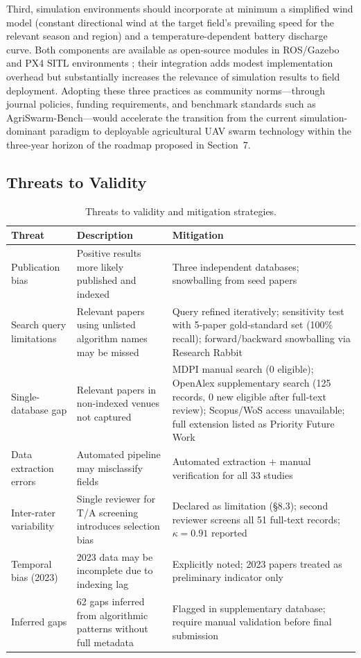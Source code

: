 \documentclass[review,3p,times]{elsarticle}
\begin{document}
Third, simulation environments should incorporate at minimum a simplified wind model (constant directional wind at the target field's prevailing speed for the relevant season and region) and a temperature-dependent battery discharge curve. Both components are available as open-source modules in ROS/Gazebo and PX4 SITL environments \cite{shafiq2022}; their integration adds modest implementation overhead but substantially increases the relevance of simulation results to field deployment. Adopting these three practices as community norms---through journal policies, funding requirements, and benchmark standards such as AgriSwarm-Bench---would accelerate the transition from the current simulation-dominant paradigm to deployable agricultural UAV swarm technology within the three-year horizon of the roadmap proposed in Section~7.

\subsection{Threats to Validity}
\begin{table}[p]
\centering
\caption{Threats to validity and mitigation strategies.}
\label{tab:threats}
\small
\begin{tabularx}{\textwidth}{p{3cm}XX}
\toprule
\textbf{Threat} & \textbf{Description} & \textbf{Mitigation} \\
\midrule
Publication bias & Positive results more likely published and indexed & Three independent databases; snowballing from seed papers \\[4pt]
Search query limitations & Relevant papers using unlisted algorithm names may be missed & Query refined iteratively; sensitivity test with 5-paper gold-standard set (100\% recall); forward/backward snowballing via Research Rabbit \\[4pt]
Single-database gap & Relevant papers in non-indexed venues not captured & MDPI manual search (0 eligible); OpenAlex supplementary search (125 records, 0 new eligible after full-text review); Scopus/WoS access unavailable; full extension listed as Priority Future Work \\[4pt]
Data extraction errors & Automated pipeline may misclassify fields & Automated extraction + manual verification for all 33 studies \\[4pt]
Inter-rater variability & Single reviewer for T/A screening introduces selection bias & Declared as limitation (§8.3); second reviewer screens all 51 full-text records; $\kappa=0.91$ reported \\[4pt]
Temporal bias (2023) & 2023 data may be incomplete due to indexing lag & Explicitly noted; 2023 papers treated as preliminary indicator only \\[4pt]
Inferred gaps & 62 gaps inferred from algorithmic patterns without full metadata & Flagged in supplementary database; require manual validation before final submission \\
\bottomrule
\end{tabularx}
\end{table}
\end{document}
